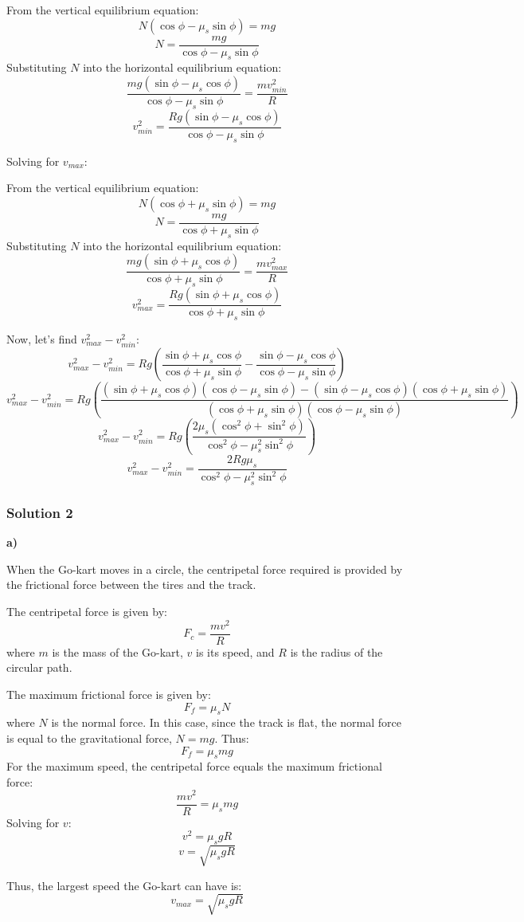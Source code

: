 \documentclass{article}
\begin{document}
From the vertical equilibrium equation:
$$N(\cos\phi - \mu_s\sin\phi) = mg$$
$$N = \frac{mg}{\cos\phi - \mu_s\sin\phi}$$
Substituting $N$ into the horizontal equilibrium equation:
$$\frac{mg(\sin\phi - \mu_s\cos\phi)}{\cos\phi - \mu_s\sin\phi} = \frac{mv_{min}^2}{R}$$
$$v_{min}^2 = \frac{Rg(\sin\phi - \mu_s\cos\phi)}{\cos\phi - \mu_s\sin\phi}$$

Solving for $v_{max}$:

From the vertical equilibrium equation:
$$N(\cos\phi + \mu_s\sin\phi) = mg$$
$$N = \frac{mg}{\cos\phi + \mu_s\sin\phi}$$
Substituting $N$ into the horizontal equilibrium equation:
$$\frac{mg(\sin\phi + \mu_s\cos\phi)}{\cos\phi + \mu_s\sin\phi} = \frac{mv_{max}^2}{R}$$
$$v_{max}^2 = \frac{Rg(\sin\phi + \mu_s\cos\phi)}{\cos\phi + \mu_s\sin\phi}$$

Now, let's find $v_{max}^2 - v_{min}^2$:
$$v_{max}^2 - v_{min}^2 = Rg\left(\frac{\sin\phi + \mu_s\cos\phi}{\cos\phi + \mu_s\sin\phi} - \frac{\sin\phi - \mu_s\cos\phi}{\cos\phi - \mu_s\sin\phi}\right)$$
$$v_{max}^2 - v_{min}^2 = Rg\left(\frac{(\sin\phi + \mu_s\cos\phi)(\cos\phi - \mu_s\sin\phi) - (\sin\phi - \mu_s\cos\phi)(\cos\phi + \mu_s\sin\phi)}{(\cos\phi + \mu_s\sin\phi)(\cos\phi - \mu_s\sin\phi)}\right)$$
$$v_{max}^2 - v_{min}^2 = Rg\left(\frac{2\mu_s(\cos^2\phi + \sin^2\phi)}{\cos^2\phi - \mu_s^2\sin^2\phi}\right)$$
$$v_{max}^2 - v_{min}^2 = \frac{2Rg\mu_s}{\cos^2\phi - \mu_s^2\sin^2\phi}$$


\subsubsection{Solution 2}
\textbf{a)}

When the Go-kart moves in a circle, the centripetal force required is provided by the frictional force between the tires and the track.

The centripetal force is given by:
$$F_c = \frac{mv^2}{R}$$
where $m$ is the mass of the Go-kart, $v$ is its speed, and $R$ is the radius of the circular path.

The maximum frictional force is given by:
$$F_f = \mu_s N$$
where $N$ is the normal force. In this case, since the track is flat, the normal force is equal to the gravitational force, $N = mg$.
Thus:
$$F_f = \mu_s mg$$
For the maximum speed, the centripetal force equals the maximum frictional force:
$$\frac{mv^2}{R} = \mu_s mg$$
Solving for $v$:
$$v^2 = \mu_s g R$$
$$v = \sqrt{\mu_s g R}$$

Thus, the largest speed the Go-kart can have is:
$$v_{max} = \sqrt{\mu_s g R}$$
\end{document}
